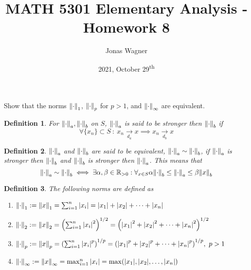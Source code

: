 \documentclass[]{article}
\title{MATH 5301 Elementary Analysis - Homework 8}
\author{Jonas Wagner}
\date{2021, October 29\textsuperscript{th}}
\newcommand{\R}{\mathbb{R}}
\newcommand{\st}{\ : \ }
\newtheorem{definition}{Definition}
\begin{document}
\maketitle

\section{}
Show that the norms $\norm{\cdot}_1$, $\norm{\cdot}_p$ for $p > 1$, and $\norm{\cdot}_\infty$ are equivalent.

\begin{definition}
    For $\norm{\cdot}_a, \norm{\cdot}_b$ on $S$, 
    $\norm{\cdot}_a$ is said to be \emph{stronger} then $\norm{\cdot}_b$ if 
    \[
        \forall \{x_n\} \subset S \st x_n \xrightarrow[d_a]{} x \implies x_n \xrightarrow[d_b]{} x
    \]
\end{definition}
\begin{definition}
    $\norm{\cdot}_a$ and $\norm{\cdot}_b$ are said to be \emph{equivalent},  $\norm{\cdot}_a \sim \norm{\cdot}_b$,
    if $\norm{\cdot}_a$ is stronger then $\norm{\cdot}_b$ 
    and $\norm{\cdot}_b$ is stronger then $\norm{\cdot}_a$. 
    This means that
    \[
        \norm{\cdot}_a \sim \norm{\cdot}_b 
            \iff \exists{\alpha,\beta \in \R_{>0}} : 
            \forall_{x\in S} \alpha \norm{\cdot}_b \leq \norm{\cdot}_a \leq \beta \norm{x}_b
    \]
\end{definition}
\begin{definition} The following norms are defined as
    \begin{enumerate}
        \item $\norm{\cdot}_1 := \norm{x}_1 = \sum_{i=1}^n \abs{x_i} = \abs{x_1} + \abs{x_2} + \dots + \abs{x_n}$
        \item $\norm{\cdot}_2 := \norm{x}_2 = \qty(\sum_{i=1}^n \abs{x_i}^2)^{1/2} = \qty(\abs{x_1}^2 + \abs{x_2}^2 + \dots + \abs{x_n}^2)^{1/2}$
        \item $\norm{\cdot}_p := \norm{x}_p = \qty(\sum_{i=1}^n \abs{x_i}^p)^{1/p} =\qty(\abs{x_1}^p + \abs{x_2}^p + \dots + \abs{x_n}^p)^{1/p}, \ p > 1$
        \item $\norm{\cdot}_\infty := \norm{x}_\infty = \max_{i=1}^n \abs{x_i} = \max(\abs{x_1}, \abs{x_2}, \dots, \abs{x_n})$
    \end{enumerate}
\end{definition}
\end{document}
